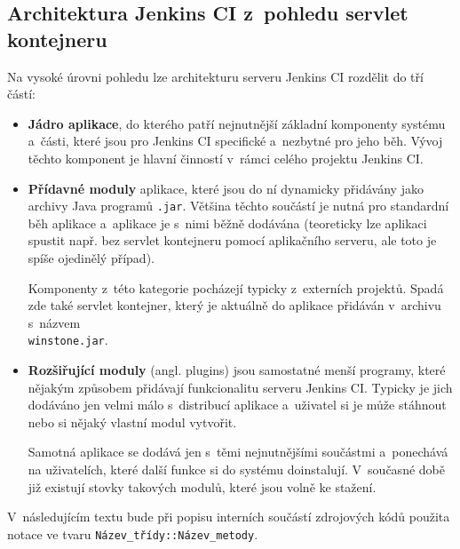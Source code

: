        \subsection{Architektura Jenkins CI z~pohledu servlet kontejneru} 
            Na vysoké úrovni pohledu lze architekturu serveru Jenkins CI rozdělit do tří částí:
            
            \begin{itemize}
                \item{\textbf{Jádro aplikace}, do kterého patří nejnutnější základní komponenty systému
                    a~části, které jsou pro Jenkins CI specifické a~nezbytné pro jeho běh. 
                    Vývoj těchto komponent je hlavní činností v~rámci celého projektu Jenkins CI.}

                \item{\textbf{Přídavné moduly} aplikace, které jsou do ní dynamicky přidávány jako archivy Java programů
                    \texttt{.jar}. Většina těchto součástí je nutná pro standardní běh aplikace a~aplikace je s~nimi 
                    běžně dodávána (teoreticky lze
                    aplikaci spustit např. bez servlet kontejneru pomocí aplikačního serveru, ale toto je spíše ojedinělý případ). 
                    
                    Komponenty z~této kategorie pocházejí typicky z~externích projektů.
                    Spadá zde také servlet kontejner, který je aktuálně do aplikace
                    přidáván v~archivu s~názvem \\\texttt{winstone.jar}.}

                \item{\textbf{Rozšiřující moduly} (angl. plugins) jsou samostatné menší programy, které nějakým
                    způsobem přidávají funkcionalitu serveru Jenkins CI. Typicky je jich dodáváno jen velmi málo
                    s~distribucí aplikace 
                    a~uživatel si je může stáhnout nebo si nějaký vlastní modul vytvořit.
                    
                    Samotná aplikace se dodává jen s~těmi nejnutnějšími součástmi a~ponechává na uživatelích, které
                    další funkce si do systému doinstalují. V~současné době již existují stovky takových
                    modulů, které jsou volně ke stažení. }
            \end{itemize}
            

            V~následujícím textu bude při popisu interních součástí zdrojových kódů použita notace
            ve tvaru \texttt{Název\_třídy::Název\_metody}.

